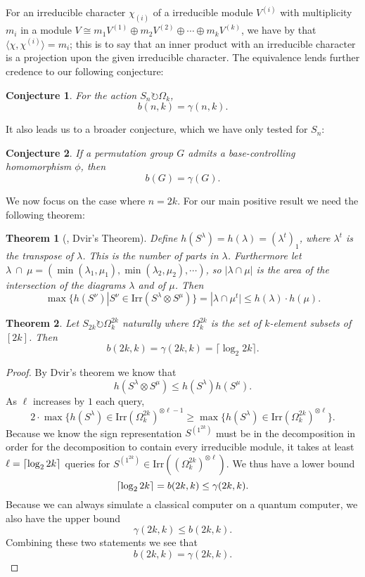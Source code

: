 \documentclass[12pt,twoside]{reedthesis}
\theoremstyle{plain}   %
\newtheorem{thm}{Theorem}[section] %
\newtheorem{conj}{Conjecture}[section]
\theoremstyle{definition}
\theoremstyle{remark}
\numberwithin{equation}{section}
\def\irr{\mathrm{Irr}}
\def\acts{\circlearrowright} %
\DeclarePairedDelimiter\ceil{\lceil}{\rceil}
\begin{document}
For an irreducible character $\chi_{(i)}$ of a irreducible module $V^{(i)}$ with multiplicity $m_i$ in a module $V \cong m_1V^{(1)} \oplus m_2V^{(2)} \oplus \cdots \oplus m_kV^{(k)}$, we have by \cite[Cor. 1.9.4]{sagan}
that $\langle \chi, \chi^{(i)} \rangle = m_i$;
this is to say that an inner product with an irreducible character is a projection upon the given irreducible character.
The equivalence lends further credence to our following conjecture:
\begin{conj}
  For the action $S_n \acts \Omega_k$,
  \[ b(n,k) = \gamma(n,k).\]
\end{conj}
It also leads us to a broader conjecture, which we have only tested for $S_n$:
\begin{conj}
  If a permutation group $G$ admits a base-controlling homomorphism $\phi$, then
  \[ b(G) = \gamma(G).\]
\end{conj}
We now focus on the case where $n = 2k$.
For our main positive result we need the following theorem:
\begin{thm}[{\cite{dvir1993}}, Dvir's Theorem]
  Define $h( S^\lambda) = h(\lambda) = (\lambda^t)_1$, where $\lambda^t$ is the transpose of $\lambda$. This is the number of parts in $\lambda$.
  Furthermore let $\lambda \ \cap \ \mu = ( \min(\lambda_1,\mu_1), \min(\lambda_2,\mu_2), \cdots)$, so
  $|\lambda \cap \mu|$ is the area of the intersection of the diagrams $\lambda$ and of $\mu$. Then
  \[\max \{ h(S^\nu) | S^\nu \in \irr (S^\lambda \otimes S^\mu) \} = | \lambda \cap \mu^t| \leq h(\lambda) \cdot h(\mu).\]
\end{thm}
\begin{thm}
  Let $S_{2k} \acts \Omega^{2k}_k$ naturally where $\Omega^{2k}_k$ is the set of $k$-element subsets of $[2k]$. Then
  \[b(2k,k) = \gamma(2k,k) = \lceil \log_2 2k \rceil.\]
\end{thm}
\begin{proof}
  By Dvir's theorem we know that
  \[ h( S^\lambda \otimes S^\mu) \leq h( S^\lambda) h (S^\mu).\]
  As $\ell$ increases by $1$ each query,
  \[ 2 \cdot \max\{ h(S^\lambda) \in \irr ( \Omega^{2k}_k)^{\otimes \ell -1} \geq \max\{ h(S^\lambda) \in \irr ( \Omega^{2k}_k)^{\otimes \ell} \}.\]
  Because we know the sign representation $S^{(1^{2k})}$ must be in the decomposition in order for the decomposition to contain every irreducible module, it takes at least
  $\ell = \ceil*{ \log_2 2k }$ queries for $S^{(1^{2k})} \in \irr(( \Omega^{2k}_k)^{\otimes \ell})$.
  We thus have a lower bound
  \[\ceil*{ \log_2 2k } = b(2k,k) \leq \gamma(2k,k).\]
  Because we can always simulate a classical computer on a quantum computer, we also have the upper bound
  \[\gamma(2k,k) \leq b(2k,k).\]
  Combining these two statements we see that
  \[ b(2k,k) = \gamma(2k,k).\]
\end{proof}
\end{document}
